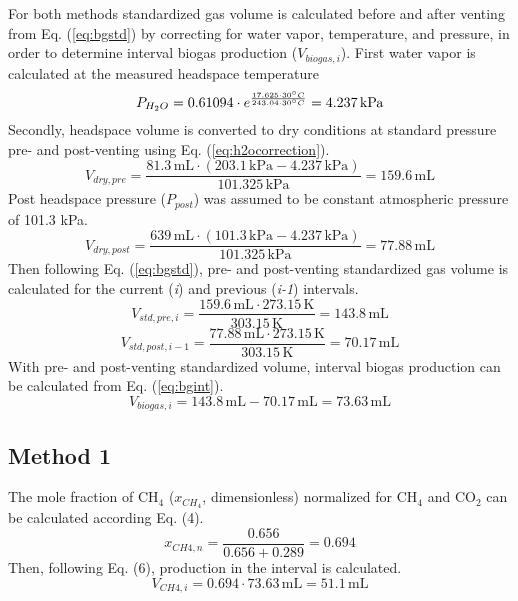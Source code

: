 \documentclass[]{article}
\newcommand{\unit}[1]{\ensuremath{\, \mathrm{#1}}}
\begin{document}
For both methods standardized gas volume is calculated before and after venting from Eq. (\ref{eq:bgstd}) by correcting for water vapor, temperature, and pressure, in order to determine interval biogas production ($V_{biogas,i}$). 
First water vapor is calculated at the measured headspace temperature
\begin{equation*}
    P_{H_{2}O} = 0.61094 \cdot e^\frac{17.625 \cdot 30\degree C}{243.04 \cdot 30\degree C} = 4.237\unit{kPa}
\end{equation*}
Secondly, headspace volume is converted to dry conditions at standard pressure pre- and post-venting using Eq. (\ref{eq:h2ocorrection}). 
\begin{equation*}
  V_{dry,pre} = \frac{81.3\unit{mL} \cdot (203.1\unit{kPa} - 4.237\unit{kPa})}{101.325\unit{kPa}} = 159.6\unit{mL}
\end{equation*}
Post headspace pressure ($P_{post}$) was assumed to be constant atmospheric pressure of 101.3 kPa. 
\begin{equation*}
    V_{dry,post} = \frac{639\unit{mL} \cdot (101.3\unit{kPa} - 4.237\unit{kPa})}{101.325\unit{kPa}} = 77.88\unit{mL}
\end{equation*}
Then following Eq. (\ref{eq:bgstd}), pre- and post-venting standardized gas volume is calculated for the current (\textit{i}) and previous (\textit{i-1}) intervals. 
\begin{equation*}
    V_{std,pre,i} = \frac{159.6\unit{mL} \cdot 273.15\unit{K}}{303.15\unit{K}} = 143.8\unit{mL}
\end{equation*}
\begin{equation*}
    V_{std,post,i-1} = \frac{77.88\unit{mL} \cdot 273.15\unit{K}}{303.15\unit{K}} = 70.17\unit{mL}
\end{equation*}
With pre- and post-venting standardized volume, interval biogas production can be calculated from Eq. (\ref{eq:bgint}).
\begin{equation*}
    V_{biogas,i} = 143.8\unit{mL} - 70.17\unit{mL} = 73.63\unit{mL}
\end{equation*}
\subsection{Method 1}
The mole fraction of CH$_{4}$ ($x_{CH_4}$, dimensionless) normalized for CH$_{4}$ and CO$_{2}$ can be calculated according Eq. (4). 
\begin{equation*}
    x_{CH{4},n} = \frac{0.656}{0.656 + 0.289} = 0.694
\end{equation*}
Then, following Eq. (6),  production in the interval is calculated.
\begin{equation*}
    V_{CH{4},i} = 0.694 \cdot 73.63\unit{mL} = 51.1\unit{mL}
\end{equation*}
\end{document}

